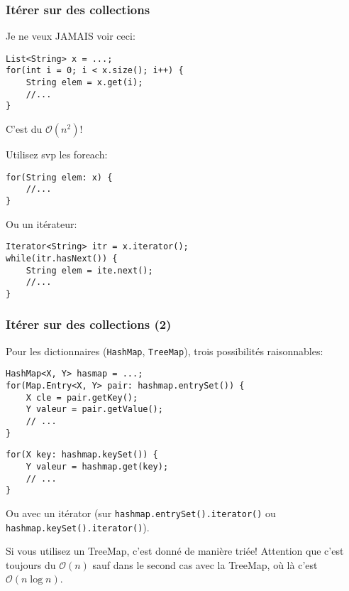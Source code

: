 \documentclass[8pt,aspectratio=169]{beamer}
\begin{document}
\begin{frame}[fragile]
\frametitle{Itérer sur des collections}
{\color{red} Je ne veux JAMAIS voir ceci:}
\begin{lstlisting}
List<String> x = ...;
for(int i = 0; i < x.size(); i++) {
	String elem = x.get(i);
	//...
}
\end{lstlisting}
{\color{red} C'est du $\mathcal{O}(n^2)$!}

{\color{blue} Utilisez svp les foreach:}
\begin{lstlisting}
for(String elem: x) {
	//...
}
\end{lstlisting}

{\color{blue} Ou un itérateur:}
\begin{lstlisting}
Iterator<String> itr = x.iterator();
while(itr.hasNext()) {
	String elem = ite.next();
	//...
}
\end{lstlisting}
\end{frame}

\begin{frame}[fragile]
\frametitle{Itérer sur des collections (2)}
Pour les dictionnaires (\texttt{HashMap}, \texttt{TreeMap}), trois possibilités raisonnables:
\begin{lstlisting}
HashMap<X, Y> hasmap = ...;
for(Map.Entry<X, Y> pair: hashmap.entrySet()) {
	X cle = pair.getKey();
	Y valeur = pair.getValue();
	// ...
}
\end{lstlisting}

\begin{lstlisting}
for(X key: hashmap.keySet()) {
	Y valeur = hashmap.get(key);
	// ...
}
\end{lstlisting}

Ou avec un itérator (sur \texttt{hashmap.entrySet().iterator()} ou \texttt{hashmap.keySet().iterator()}).

Si vous utilisez un TreeMap, c'est donné de manière triée! Attention que c'est toujours du $\mathcal{O}(n)$ sauf dans le second cas avec la TreeMap, où là c'est $\mathcal{O}(n \log n)$.
\end{frame}
\end{document}
